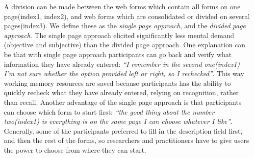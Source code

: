 \documentclass[../main/Replicate.tex]{subfiles}
\begin{document}
%	
	A division can be made between the web forms which contain all forms on one page(index1, index2), and web forms which are consolidated or divided on several pages(index3). We define these as the \textit{single page approach}, and the \textit{divided page approach}.
	The single page approach elicited significantly less mental demand (objective and subjective) than the divided page approach. 
	One explanation can be that with single page approach participants can go back and verify what information they have already entered: \textit{``I remember in the second one(index1) I'm not sure whether the option provided left or right, so I rechecked''}. 
	This way working memory resources are saved because participants has the ability to quickly recheck what they have already entered, relying on recognition, rather than recall\cite{nielsen1990heuristic}. 
	Another advantage of the single page approach is that participants can choose which form to start first: \textit{``the good thing about the number two(index1) is everything is on the same page I can choose whatever I like''}. 
	Generally, some of the participants preferred to fill in the description field first, and then the rest of the forms, so researchers and practitioners have to give users the power to choose from where they can start. 
	
	
\end{document}

